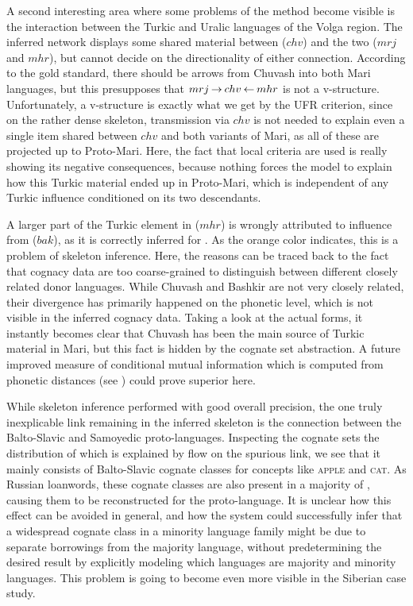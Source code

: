  A second interesting area where some problems of the method become visible is the interaction between the Turkic and Uralic languages of the Volga region. The inferred network displays some shared material between  ($chv$) and the two  ($mrj$ and $mhr$), but cannot decide on the directionality of either connection. According to the gold standard, there should be arrows from Chuvash into both Mari languages, but this presupposes that $mrj \kern 2pt\hbox{$\rightarrow$}\kern 2pt chv \kern 2pt\hbox{$\leftarrow$}\kern 2pt mhr$ is not a v-structure. Unfortunately, a v-structure is exactly what we get by the UFR criterion, since on the rather dense skeleton, transmission via $chv$ is not needed to explain even a single item shared between $chv$ and both variants of Mari, as all of these are projected up to Proto-Mari. Here, the fact that local criteria are used is really showing its negative consequences, because nothing forces the model to explain how this Turkic material ended up in Proto-Mari, which is independent of any Turkic influence conditioned on its two descendants.
 
 A larger part of the Turkic element in  ($mhr$) is wrongly attributed to influence from  ($bak$), as it is correctly inferred for . As the orange color indicates, this is a problem of skeleton inference. Here, the reasons can be traced back to the fact that cognacy data are too coarse-grained to distinguish between different closely related donor languages. While Chuvash and Bashkir are not very closely related, their divergence has primarily happened on the phonetic level, which is not visible in the inferred cognacy data. Taking a look at the actual forms, it instantly becomes clear that Chuvash has been the main source of Turkic material in Mari, but this fact is hidden by the cognate set abstraction. A future improved measure of conditional mutual information which is computed from phonetic distances (see ) could prove superior here.
 
 While skeleton inference performed with good overall precision, the one truly inexplicable link remaining in the inferred skeleton is the connection between the Balto-Slavic and Samoyedic proto-languages. Inspecting the cognate sets the distribution of which is explained by flow on the spurious link, we see that it mainly consists of Balto-Slavic cognate classes for concepts like \textsc{apple} and \textsc{cat}. As Russian loanwords, these cognate classes are also present in a majority of , causing them to be reconstructed for the proto-language. It is unclear how this effect can be avoided in general, and how the system could successfully infer that a widespread cognate class in a minority language family might be due to separate borrowings from the majority language, without predetermining the desired result by explicitly modeling which languages are majority and minority languages. This problem is going to become even more visible in the Siberian case study.
 
